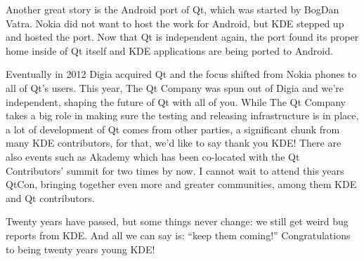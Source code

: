 Another great story is the Android port of Qt, which was started by BogDan Vatra. Nokia did not want to host the work for Android, but KDE stepped up and hosted the port. Now that Qt is independent again, the port found its proper home inside of Qt itself and KDE applications are being ported to Android.

Eventually in 2012 Digia acquired Qt and the focus shifted from Nokia phones to all of Qt's users. This year, The Qt Company was spun out of Digia and we're independent, shaping the future of Qt with all of you. While The Qt Company takes a big role in making sure the testing and releasing infrastructure is in place, a lot of development of Qt comes from other parties, a significant chunk from many KDE contributors, for that, we'd like to say thank you KDE! There are also events such as Akademy which has been co-located with the Qt Contributors' summit for two times by now. I cannot wait to attend this years QtCon, bringing together even more and greater communities, among them KDE and Qt contributors.

Twenty years have passed, but some things never change: we still get weird bug reports from KDE. And all we can say is: “keep them coming!” Congratulations to being twenty years young KDE!
